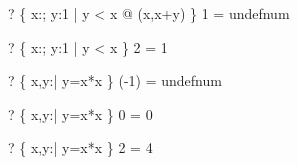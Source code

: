 \begin{zed} \vdash?  \{ x:\nat; y:1  | y < x @ (x,x+y) \} 1 = undefnum \end{zed}
\begin{zed} \vdash?   \{ x:\nat; y:1  | y < x \} 2 = 1 \end{zed}
\begin{zed} \vdash?  \{ x,y:\nat | y=x*x \} (-1) = undefnum \end{zed}
\begin{zed} \vdash?   \{ x,y:\nat | y=x*x \} 0 = 0 \end{zed}
\begin{zed} \vdash?   \{ x,y:\nat | y=x*x \} 2 = 4 \end{zed}



